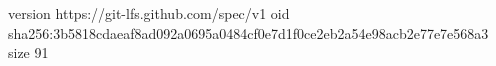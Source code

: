 version https://git-lfs.github.com/spec/v1
oid sha256:3b5818cdaeaf8ad092a0695a0484cf0e7d1f0ce2eb2a54e98acb2e77e7e568a3
size 91
